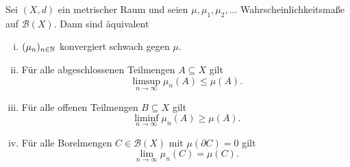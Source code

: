 
\begin{theorem}
    Sei $(X,d)$ ein metrischer Raum und seien $\mu, \mu_1, \mu_2,...$ Wahrscheinlichkeitsmaße auf $\mathcal{B}(X)$. Dann sind äquivalent
    \begin{enumerate}[(i)]
        \item $(\mu_n)_{n \in \mathbb{N}}$ konvergiert schwach gegen $\mu$.
        \item Für alle abgeschlossenen Teilmengen $A \subseteq X$ gilt 
        $$
            \limsup_{n \to \infty} \mu_n(A) \leq \mu(A).
        $$
        \item Für alle offenen Teilmengen $B \subseteq X$ gilt 
        $$
            \liminf_{n \to \infty} \mu_n(A) \geq \mu(A).
        $$
        \item Für alle Borelmengen $C \in \mathcal{B}(X)$ mit $\mu(\partial C) = 0$ gilt 
        $$
            \lim_{n \to \infty}\mu_n(C) = \mu(C).
        $$
    \end{enumerate}
\end{theorem}

